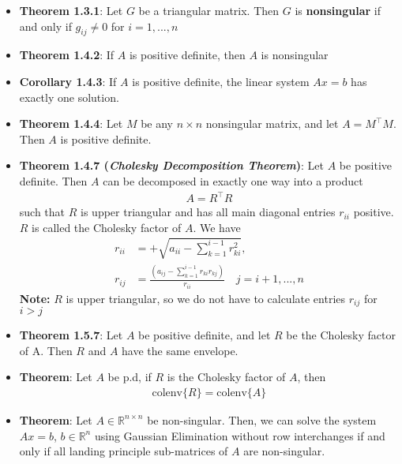 \documentclass{report}
\begin{document}
\begin{itemize}
\begin{enumerate}[(a)]
            \end{enumerate}
        \item \textbf{Theorem 1.3.1}: Let $G$ be a triangular matrix. Then $G$ is \textbf{nonsingular} if and only if
            $g_{ij} \ne 0$ for $i=1,...,n $
        \item \textbf{Theorem 1.4.2}: If $A$ is positive definite, then $A$ is nonsingular
        \item \textbf{Corollary 1.4.3}: If $A$ is positive definite, the linear system $Ax = b$ has exactly one solution.
        \item \textbf{Theorem 1.4.4}: Let $M$ be any $n \times n$ nonsingular matrix, and let $A = M^{\top}M$. Then $A$ is positive definite.
        \item \textbf{Theorem 1.4.7 (\textit{Cholesky Decomposition Theorem})}: Let $A$ be positive definite. Then $A$ can be decomposed in exactly one way into a product
            \begin{align*}
                A = R^{\top}R
            \end{align*}
            such that $R$ is upper triangular and has all main diagonal entries $r_{ii}$ positive. $R$ is called the Cholesky factor of $A$.
            \bigbreak \noindent 
            We have
            \begin{align*}
                r_{ii} &= +\sqrt{a_{ii} - \sum_{k=1}^{i-1}r_{ki}^{2}}, \\
                r_{ij} &= \frac{\left(a_{ij} - \sum_{k=1}^{i-1}r_{ki}r_{kj}\right)}{r_{ii}} \quad j=i+1,...,n
            \end{align*}
            \textbf{Note:} $R$ is upper triangular, so we do not have to calculate entries $r_{ij}$ for $i > j $
        \item \textbf{Theorem 1.5.7}: Let $A$ be positive definite, and let $R$ be the Cholesky factor of A. Then $R$ and $A$ have the same envelope.
        \item \textbf{Theorem}: Let $A$ be p.d, if $R$ is the Cholesky factor of $A$, then
            \begin{align*}
                \text{colenv}\{R\}  = \text{colenv}\{A\}
            \end{align*}
    \item \textbf{Theorem}: Let $A \in \mathbb{R}^{n\times n}$ be non-singular. Then, we can solve the system $Ax = b$, $b \in \mathbb{R}^{n}$ using Gaussian Elimination without row interchanges if and only if all landing principle sub-matrices of $A$ are non-singular.

\end{itemize}
\end{document}
